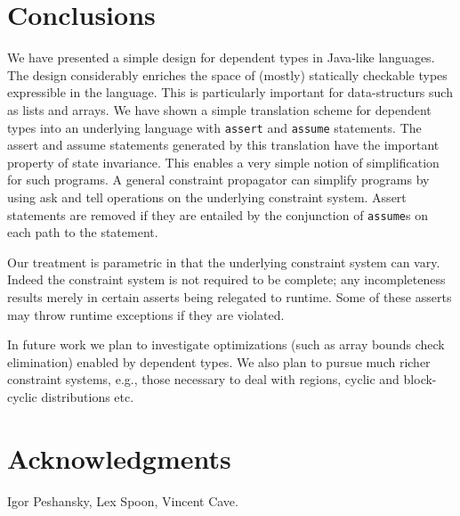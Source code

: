 \documentclass[nocopyrightspace,preprint,9pt]{sigplanconf}
\newcommand\java{{Java}}
\begin{document}
\section{Conclusions}
\label{sec:conclusions}

We have presented a simple design for dependent types in \java-like
languages. The design considerably enriches the space of (mostly)
statically checkable types expressible in the language. This is
particularly important for data-structurs such as lists and arrays. We
have shown a simple translation scheme for dependent types into an
underlying language with {\tt assert} and {\tt assume} statements.
The assert and assume statements generated by this translation have
the important property of state invariance. This enables a very simple
notion of simplification for such programs. A general constraint
propagator can simplify programs by using ask and tell operations on
the underlying constraint system. Assert statements are removed if they
are entailed by the conjunction of {\tt assume}s on each path to the
statement.

Our treatment is parametric in that the underlying constraint system
can vary. Indeed the constraint system is not required to be complete;
any incompleteness results merely in certain asserts being relegated
to runtime. Some of these asserts may throw runtime exceptions if they
are violated.

In future work we plan to investigate optimizations (such as array
bounds check elimination) enabled by dependent types. We also plan to
pursue much richer constraint systems, e.g., those necessary to deal
with regions, cyclic and block-cyclic distributions etc.

\section*{Acknowledgments}

Igor Peshansky,
Lex Spoon,
Vincent Cave.




\balance
\appendix
\onecolumn
\end{document}
